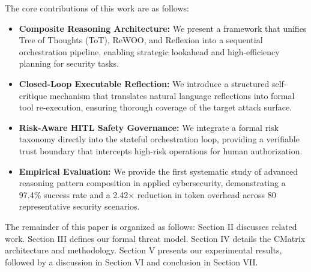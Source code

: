 The core contributions of this work are as follows:
\begin{itemize}
    \item \textbf{Composite Reasoning Architecture:} We present a framework that unifies Tree of Thoughts (ToT), ReWOO, and Reflexion into a sequential orchestration pipeline, enabling strategic lookahead and high-efficiency planning for security tasks.
    \item \textbf{Closed-Loop Executable Reflection:} We introduce a structured self-critique mechanism that translates natural language reflections into formal tool re-execution, ensuring thorough coverage of the target attack surface.
    \item \textbf{Risk-Aware HITL Safety Governance:} We integrate a formal risk taxonomy directly into the stateful orchestration loop, providing a verifiable trust boundary that intercepts high-risk operations for human authorization.
    \item \textbf{Empirical Evaluation:} We provide the first systematic study of advanced reasoning pattern composition in applied cybersecurity, demonstrating a 97.4\% success rate and a 2.42$\times$ reduction in token overhead across 80 representative security scenarios.
\end{itemize}

The remainder of this paper is organized as follows: Section II discusses related work. Section III defines our formal threat model. Section IV details the CMatrix architecture and methodology. Section V presents our experimental results, followed by a discussion in Section VI and conclusion in Section VII.
